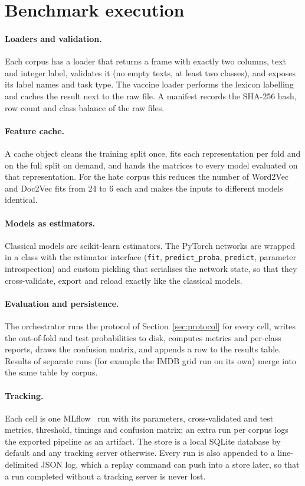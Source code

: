 \section{Benchmark execution}
\paragraph{Loaders and validation.} Each corpus has a loader that returns a frame with exactly two columns, text and integer label, validates it (no empty texts, at least two classes), and exposes its label names and task type. The vaccine loader performs the lexicon labelling and caches the result next to the raw file. A manifest records the SHA-256 hash, row count and class balance of the raw files.

\paragraph{Feature cache.} A cache object cleans the training split once, fits each representation per fold and on the full split on demand, and hands the matrices to every model evaluated on that representation. For the hate corpus this reduces the number of Word2Vec and Doc2Vec fits from 24 to 6 each and makes the inputs to different models identical.

\paragraph{Models as estimators.} Classical models are scikit-learn estimators. The PyTorch networks are wrapped in a class with the estimator interface (\texttt{fit}, \texttt{predict\_proba}, \texttt{predict}, parameter introspection) and custom pickling that serialises the network state, so that they cross-validate, export and reload exactly like the classical models.

\paragraph{Evaluation and persistence.} The orchestrator runs the protocol of Section~\ref{sec:protocol} for every cell, writes the out-of-fold and test probabilities to disk, computes metrics and per-class reports, draws the confusion matrix, and appends a row to the results table. Results of separate runs (for example the IMDB grid run on its own) merge into the same table by corpus.

\paragraph{Tracking.} Each cell is one MLflow~\cite{zaharia2018} run with its parameters, cross-validated and test metrics, threshold, timings and confusion matrix; an extra run per corpus logs the exported pipeline as an artifact. The store is a local SQLite database by default and any tracking server otherwise. Every run is also appended to a line-delimited JSON log, which a replay command can push into a store later, so that a run completed without a tracking server is never lost.

